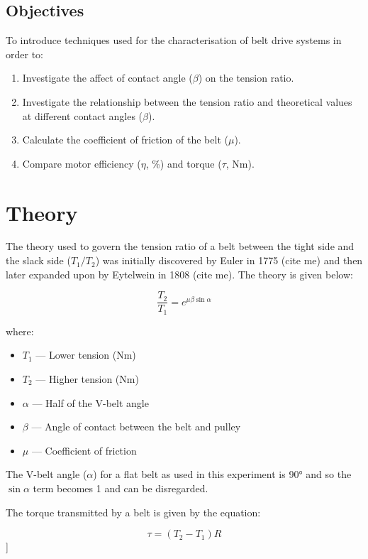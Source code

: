 \documentclass[a4paper,12pt]{article}
\begin{document}
\subsection{Objectives}
To introduce techniques used for the characterisation of belt drive systems in order to: 


\begin{enumerate}
    \item Investigate the affect of contact angle ($\beta$) on the tension ratio.
    \item Investigate the relationship between the tension ratio and theoretical values at different contact angles ($\beta$).
    \item Calculate the coefficient of friction of the belt ($\mu$).
    \item Compare motor efficiency ($\eta$, \%) and torque ($\tau$, Nm).
\end{enumerate}

\section{Theory}
The theory used to govern the tension ratio of a belt between the tight side and the slack side ($T_1/T_2$) was initially discovered by Euler in 1775 (cite me) and then later expanded upon by Eytelwein in 1808 (cite me). The theory is given below: 

\begin{equation}
    \frac{T_2}{T_1} = e^{\mu \beta \sin\alpha}
    \label{eq:tension_ratio}
\end{equation}

where:
\begin{itemize}
    \item \( T_1 \) — Lower tension (Nm)
    \item \( T_2 \) — Higher tension (Nm)
    \item \( \alpha \) — Half of the V-belt angle
    \item \( \beta \) — Angle of contact between the belt and pulley
    \item \( \mu \) — Coefficient of friction
\end{itemize}

The V-belt angle ($\alpha$) for a flat belt as used in this experiment is 90° and so the $\sin\alpha$ term becomes 1 and can be disregarded.

The torque transmitted by a belt is given by the equation: 

\begin{equation}
    \tau = (T_2 - T_1) R
    \label{eq:torque}
\end{equation}]
\end{document}
